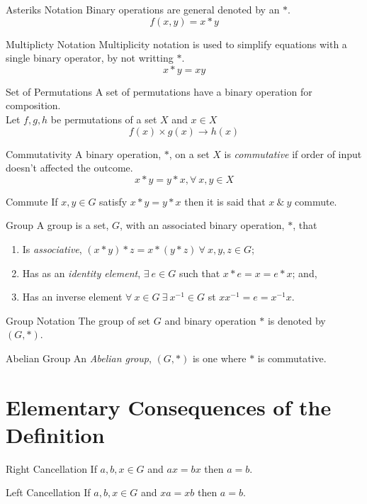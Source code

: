 \documentclass[11pt,a4paper]{article}
\begin{document}
\subtitle{Remark 2.02 - }{Asteriks Notation}
Binary operations are general denoted by an $*$. $$f(x, y) = x*y$$

\subtitle{Remark 2.03 - }{Multiplicty Notation}
Multiplicity notation is used to simplify equations with a single binary operator, by not writting $*$. $$x * y = xy$$

\subtitle{Remark 2.04 - }{Set of Permutations}
A set of permutations have a binary operation for composition.\\
Let $f, g, h$ be permutations of a set $X$ and $x \in X$ $$f(x) \times g(x) \to h(x)$$

\subtitle{Definition 2.05 - }{Commutativity}
A binary operation, $*$, on a set $X$ is \textit{commutative} if order of input doesn't affected the outcome. $$x * y = y * x,\forall\ x, y \in X$$

\subtitle{Definition 2.06 - }{Commute}
If $x, y \in G$ satisfy $x*y = y*x$ then it is said that $x\ \&\ y$ commute.\\

\subtitle{Defintion 2.07 - }{Group}
A group is a set, $G$, with an associated binary operation, $*$, that
\begin{enumerate}[label=\roman*)]
  \item Is \textit{associative}, $(x * y) * z = x * (y * z)\ \forall\ x, y, z \in G$;
  \item Has as an \textit{identity element}, $\exists\ e \in G$ such that $x * e = x = e * x$; and,
  \item Has an inverse element $\forall\ x \in G\ \exists\ x^{-1} \in G$ st $xx^{-1} = e = x^{-1}x$.\\
\end{enumerate}

\subtitle{Remark 2.08 - }{Group Notation}
The group of set $G$ and binary operation $*$ is denoted by $(G, *)$.\\

\subtitle{Definition 2.09 - }{Abelian Group}
An \textit{Abelian group}, $(G, *)$ is one where $*$ is commutative.

\section{Elementary Consequences of the Definition}

\subtitle{Proposition 3.01 - }{Right Cancellation}
If $a, b, x \in G$ and $ax = bx$ then $a = b$.\\

\subtitle{Proposition 3.02 - }{Left Cancellation}
If $a, b, x \in G$ and $xa = xb$ then $a = b$.\\
\end{document}
